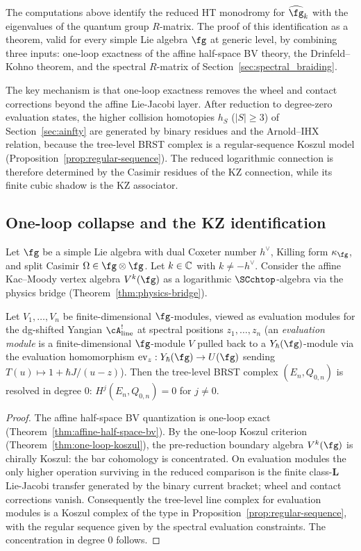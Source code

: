 The computations above identify the reduced HT monodromy for $\widehat{\fg}_k$ with the eigenvalues of the quantum group $R$-matrix. The proof of this identification as a theorem, valid for every simple Lie algebra $\fg$ at generic level, by combining three inputs: one-loop exactness of the affine half-space BV theory, the Drinfeld--Kohno theorem, and the spectral $R$-matrix of Section~\ref{sec:spectral_braiding}.

The key mechanism is that one-loop exactness removes the wheel and contact corrections beyond the affine Lie-Jacobi layer. After reduction to degree-zero evaluation states, the higher collision homotopies $h_S$ ($|S| \geq 3$) of Section~\ref{sec:ainfty} are generated by binary residues and the Arnold--IHX relation, because the tree-level BRST complex is a regular-sequence Koszul model (Proposition~\ref{prop:regular-sequence}). The reduced logarithmic connection is therefore determined by the Casimir residues of the KZ connection, while its finite cubic shadow is the KZ associator.

\subsection{One-loop collapse and the KZ identification}

Let $\fg$ be a simple Lie algebra with dual Coxeter number $h^\vee$, Killing form $\kappa_\fg$, and split Casimir $\Omega \in \fg \otimes \fg$. Let $k \in \mathbb C$ with $k \neq -h^\vee$. Consider the affine Kac--Moody vertex algebra $V^k(\fg)$ as a logarithmic $\SCchtop$-algebra via the physics bridge (Theorem~\ref{thm:physics-bridge}).

\begin{proposition}
\label{prop:affine-resolved}
Let $V_1, \dots, V_n$ be finite-dimensional $\fg$-modules, viewed as evaluation modules for the dg-shifted Yangian $\cA^!_{\mathrm{line}}$ at spectral positions $z_1, \dots, z_n$ (an \emph{evaluation module} is a finite-dimensional $\fg$-module $V$ pulled back to a $Y_\hbar(\fg)$-module via the evaluation homomorphism $\mathrm{ev}_z: Y_\hbar(\fg) \to U(\fg)$ sending $T(u) \mapsto 1 + \hbar J/(u-z)$). Then the tree-level BRST complex $(E_n, Q_{0,n})$ is resolved in degree $0$: $H^j(E_n, Q_{0,n}) = 0$ for $j \neq 0$.
\end{proposition}

\begin{proof}
The affine half-space BV quantization is one-loop exact (Theorem~\ref{thm:affine-half-space-bv}). By the one-loop Koszul criterion (Theorem~\ref{thm:one-loop-koszul}), the pre-reduction boundary algebra $V^k(\fg)$ is chirally Koszul: the bar cohomology is concentrated. On evaluation modules the only higher operation surviving in the reduced comparison is the finite class-$\mathbf L$ Lie-Jacobi transfer generated by the binary current bracket; wheel and contact corrections vanish. Consequently the tree-level line complex for evaluation modules is a Koszul complex of the type in Proposition~\ref{prop:regular-sequence}, with the regular sequence given by the spectral evaluation constraints. The concentration in degree $0$ follows.
\end{proof}

